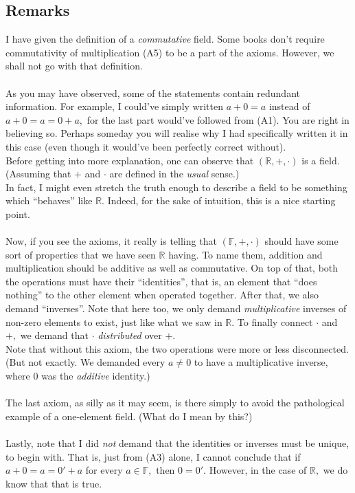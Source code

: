 \documentclass{article}
\begin{document}
\subsection{Remarks}
I have given the definition of a \emph{commutative} field. Some books don't require commutativity of multiplication (A5) to be a part of the axioms.  However, we shall not go with that definition. \\~\\
As you may have observed, some of the statements contain redundant information. For example, I could've simply written $a + 0 = a$ instead of $a + 0 = a = 0 + a,$ for the last part would've followed from (A1). You are right in believing so. Perhaps someday you will realise why I had specifically written it in this case (even though it would've been perfectly correct without).\\
Before getting into more explanation, one can observe that $(\mathbb{R}, +, \cdot)$ is a field. (Assuming that $+$ and $\cdot$ are defined in the \emph{usual} sense.)\\
In fact, I might even stretch the truth enough to describe a field to be something which ``behaves'' like $\mathbb{R}.$ Indeed, for the sake of intuition, this is a nice starting point.\\~\\
Now, if you see the axioms, it really is telling that $(\mathbb{F}, +, \cdot)$ should have some sort of properties that we have seen $\mathbb{R}$ having. To name them, addition and multiplication should be additive as well as commutative. On top of that, both the operations must have their ``identities'', that is, an element that ``does nothing'' to the other element when operated together. After that, we also demand ``inverses''. Note that here too, we only demand \emph{multiplicative} inverses of non-zero elements to exist, just like what we saw in $\mathbb{R}.$ To finally connect $\cdot$ and $+,$ we demand that $\cdot$ \emph{distributed} over $+.$\\
Note that without this axiom, the two operations were more or less disconnected. (But not exactly. We demanded every $a \neq 0$ to have a multiplicative inverse, where $0$ was the \emph{additive} identity.)\\~\\
The last axiom, as silly as it may seem, is there simply to avoid the pathological example of a one-element field. (What do I mean by this?)\\~\\
Lastly, note that I did \emph{not} demand that the identities or inverses must be unique, to begin with. That is, just from (A3) alone, I cannot conclude that if $a + 0 = a = 0' + a$ for every $a \in \mathbb{F},$ then $0 = 0'.$ However, in the case of $\mathbb{R},$ we do know that that is true.\\
\end{document}
